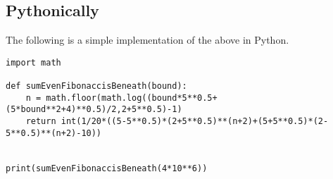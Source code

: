 \documentclass[titlepage]{article}
\begin{document}
\subsection{Pythonically}
The following is a simple implementation of the above in Python.
\begin{lstlisting}
import math

def sumEvenFibonaccisBeneath(bound):
    n = math.floor(math.log((bound*5**0.5+(5*bound**2+4)**0.5)/2,2+5**0.5)-1)
    return int(1/20*((5-5**0.5)*(2+5**0.5)**(n+2)+(5+5**0.5)*(2-5**0.5)**(n+2)-10))


print(sumEvenFibonaccisBeneath(4*10**6))
\end{lstlisting}
\end{document}
